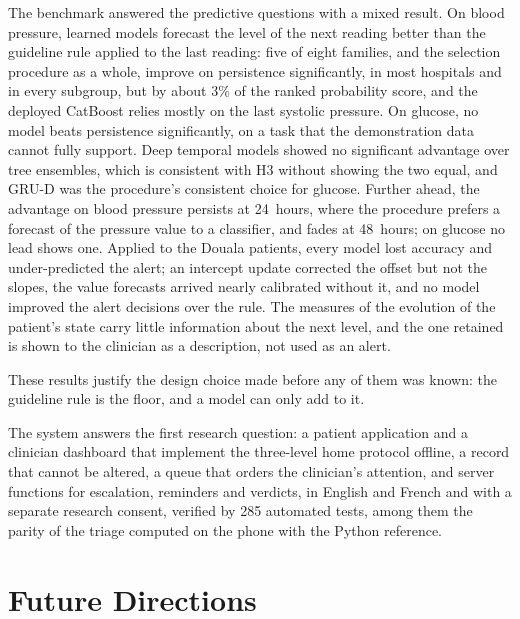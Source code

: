 \documentclass[11pt,a4paper,oneside]{report}
\begin{document}
The benchmark answered the predictive questions with a mixed result. On blood pressure, learned models forecast the level of the next reading better than the guideline rule applied to the last reading: five of eight families, and the selection procedure as a whole, improve on persistence significantly, in most hospitals and in every subgroup, but by about 3\% of the ranked probability score, and the deployed CatBoost relies mostly on the last systolic pressure. On glucose, no model beats persistence significantly, on a task that the demonstration data cannot fully support. Deep temporal models showed no significant advantage over tree ensembles, which is consistent with H3 without showing the two equal, and GRU-D was the procedure's consistent choice for glucose. Further ahead, the advantage on blood pressure persists at 24~hours, where the procedure prefers a forecast of the pressure value to a classifier, and fades at 48~hours; on glucose no lead shows one. Applied to the Douala patients, every model lost accuracy and under-predicted the alert; an intercept update corrected the offset but not the slopes, the value forecasts arrived nearly calibrated without it, and no model improved the alert decisions over the rule. The measures of the evolution of the patient's state carry little information about the next level, and the one retained is shown to the clinician as a description, not used as an alert.

These results justify the design choice made before any of them was known: the guideline rule is the floor, and a model can only add to it.

The system answers the first research question: a patient application and a clinician dashboard that implement the three-level home protocol offline, a record that cannot be altered, a queue that orders the clinician's attention, and server functions for escalation, reminders and verdicts, in English and French and with a separate research consent, verified by 285 automated tests, among them the parity of the triage computed on the phone with the Python reference.

\section*{Future Directions}
\end{document}
